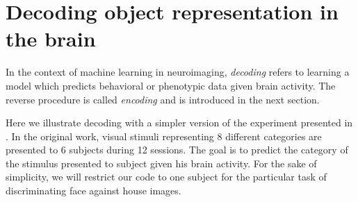 \documentclass{frontiersSCNS} %
\begin{document}

%




\section{Decoding object representation in the brain}

In the context of machine learning in neuroimaging, \textit{decoding} refers to learning a model
which predicts behavioral or phenotypic data given brain activity. 
The reverse procedure is
called \textit{encoding} \citep{naselaris2011} and is introduced in the next 
section.

Here we illustrate decoding with a simpler version of the experiment presented in
\cite{haxby2001}. In the original work, visual stimuli representing 8 different categories
are presented to 6 subjects during 12 sessions. The goal is to 
predict the category of the stimulus presented to subject given his
brain activity. For the sake of simplicity, we will restrict our code 
to one subject for the
particular task of discriminating face against house images.
\end{document}
